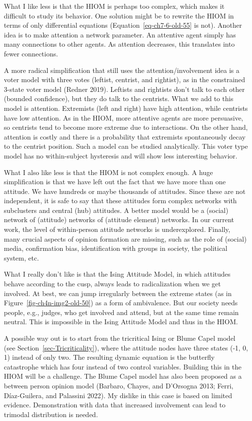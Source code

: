 \documentclass[
  a4paper,
  DIV=11,
  numbers=noendperiod,
  oneside]{scrreprt}
\begin{document}
What I like less is that the HIOM is perhaps too complex, which makes it
difficult to study its behavior. One solution might be to rewrite the
HIOM in terms of only differential equations
(Equation~\ref{eq-ch7-6-old-55} is not). Another idea is to make
attention a network parameter. An attentive agent simply has many
connections to other agents. As attention decreases, this translates
into fewer connections.

A more radical simplification that still uses the attention/involvement
idea is a voter model with three votes (leftist, centrist, and
rightist), as in the constrained 3-state voter model (Redner 2019).
Leftists and rightists don't talk to each other (bounded confidence),
but they do talk to the centrists. What we add to this model is
attention. Extremists (left and right) have high attention, while
centrists have low attention. As in the HIOM, more attentive agents are
more persuasive, so centrists tend to become more extreme due to
interactions. On the other hand, attention is costly and there is a
probability that extremists spontaneously decay to the centrist
position. Such a model can be studied analytically. This voter type
model has no within-subject hysteresis and will show less interesting
behavior.

What I also like less is that the HIOM is not complex enough. A huge
simplification is that we have left out the fact that we have more than
one attitude. We have hundreds or maybe thousands of attitudes. Since
these are not independent, it is safe to say that these attitudes form
complex networks with subclusters and central (hub) attitudes. A better
model would be a (social) network of (attitude) networks of (attitude
element) networks. In our current work, the level of within-person
attitude networks is underexplored. Finally, many crucial aspects of
opinion formation are missing, such as the role of (social) media,
confirmation bias, identification with groups in society, the political
system, etc.

What I really don't like is that the Ising Attitude Model, in which
attitudes behave according to the cusp, always leads to radicalization
when we get involved. At best, we can jump irregularly between the
extreme states (as in Figure~\ref{fig-ch4n-img2-old-50}) as a form of
ambivalence. But our society needs people, e.g., judges, who get
involved and attend, but at the same time remain neutral. This is
impossible in the Ising Attitude Model and thus in the HIOM.

A possible way out is to start from the tricritical Ising or Blume Capel
model (see Section~\ref{sec-Tricriticality}), where the attitude nodes
have three states (-1, 0, 1) instead of only two. The resulting dynamic
equation is the butterfly catastrophe which has four instead of two
control variables. Building this in the HIOM will be a challenge. The
Blume Capel model has also been proposed as a between person opinion
model (Barbaro, Chayes, and D'Orsogna 2013; Ferri, Díaz-Guilera, and
Palassini 2022). My dislike in this case is based on limited evidence.
Demonstration with data that increased involvement can lead to trimodal
distribution is needed.
\end{document}

